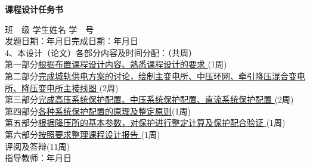 \begin{center}
	{\hei {} \textbf{课程设计任务书}}
\end{center}

\hspace{-0.85cm}班\ \ 级\underline{}
学生姓名\underline{}
学\ \ 号\underline{}
\\发题日期：\hspace{2cm}年\hspace{1cm}月\hspace{1cm}日\hfill 完成日期：\hspace{2cm}年\hspace{1cm}月\hspace{1cm}日\\
\hspace{-0.85cm}4、本设计（论文）各部分内容及时间分配：（共\underline{}周）
\\第一部分\uline{\quad 根据布置课程设计内容、熟悉课程设计的要求 \quad}\hfill(1周)
\\第二部分\uline{\quad 完成城轨供电方案的讨论，绘制主变电所、中压环网、牵引降压混合变电所、降压变电所主接线图 \quad}\hfill(2周)
\\第三部分\uline{\quad 完成高压系统保护配置、中压系统保护配置、直流系统保护配置 \quad}\hfill(2周)
\\第四部分\uline{\quad 各种系统保护配置的原理及整定原则\quad}\hfill(1周)
\\第五部分\uline{\quad 根据降压所的基本参数，对保护进行整定计算及保护配合验证 \quad}\hfill(1周)
\\第六部分\uline{\quad 按照要求整理课程设计报告 \quad}\hfill(1周)
\\评阅及答辩\hfill(11周)
\\指导教师：\hspace{4cm}年\hspace{1cm}月\hspace{1cm}日

